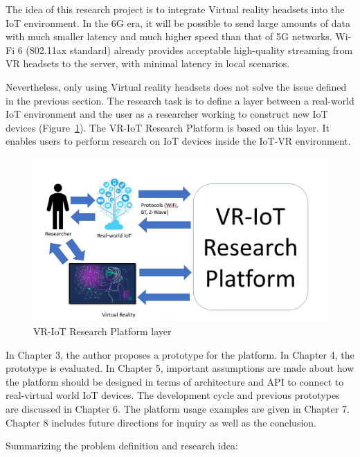 The idea of this research project is to integrate Virtual reality headsets into the IoT environment. In the 6G era, it will be possible to send large amounts of data with much smaller latency and much higher speed than that of 5G networks. Wi-Fi 6 (802.11ax standard) already provides acceptable high-quality streaming from VR headsets to the server, with minimal latency in local scenarios.

Nevertheless, only using Virtual reality headsets does not solve the issue defined in the previous section. The research task is to define a layer between a real-world IoT environment and the user as a researcher working to construct new IoT devices (Figure~\ref{fig:VR-IoTResearchPlatformLayer-figure}). The VR-IoT Research Platform is based on this layer. It enables users to perform research on IoT devices inside the IoT-VR environment.

\begin{figure} 
  \centering
  \includegraphics[width=0.9\linewidth]{figures/VR-IoTResearchPlatformLayer.png}
  \caption{VR-IoT Research Platform layer}
  \label{fig:VR-IoTResearchPlatformLayer-figure}
\end{figure}

In Chapter 3, the author proposes a prototype for the platform. In Chapter 4, the prototype is evaluated. In Chapter 5, important assumptions are made about how the platform should be designed in terms of architecture and API to connect to real-virtual world IoT devices. The development cycle and previous prototypes are discussed in Chapter 6. The platform usage examples are given in Chapter 7. Chapter 8 includes future directions for inquiry as well as the conclusion.

Summarizing the problem definition and research idea:

